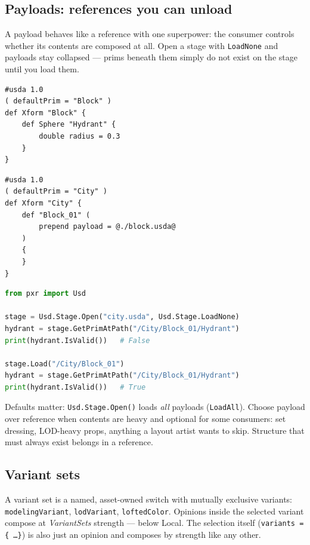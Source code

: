 \subsection{Payloads: references you can unload}\label{sec:c-payloads}
A payload behaves like a reference with one superpower: the
consumer controls whether its contents are composed at all. Open a stage with
\texttt{LoadNone} and payloads stay collapsed --- prims beneath them simply do
not exist on the stage until you load them.

\begin{lstlisting}
#usda 1.0
( defaultPrim = "Block" )
def Xform "Block" {
    def Sphere "Hydrant" {
        double radius = 0.3
    }
}
\end{lstlisting}

\begin{lstlisting}
#usda 1.0
( defaultPrim = "City" )
def Xform "City" {
    def "Block_01" (
        prepend payload = @./block.usda@
    )
    {
    }
}
\end{lstlisting}

\begin{lstlisting}[language=Python]
from pxr import Usd

stage = Usd.Stage.Open("city.usda", Usd.Stage.LoadNone)
hydrant = stage.GetPrimAtPath("/City/Block_01/Hydrant")
print(hydrant.IsValid())   # False

stage.Load("/City/Block_01")
hydrant = stage.GetPrimAtPath("/City/Block_01/Hydrant")
print(hydrant.IsValid())   # True
\end{lstlisting}

\begin{ExamTip}
Defaults matter: \texttt{Usd.Stage.Open()} loads \emph{all} payloads
(\texttt{LoadAll}). Choose payload over reference when contents are heavy and
optional for some consumers: set dressing, LOD-heavy props, anything a layout
artist wants to skip. Structure that must always exist belongs in a reference.
\end{ExamTip}

\subsection{Variant sets}\label{sec:c-variants}
A variant set is a named, asset-owned switch with mutually
exclusive variants: \texttt{modelingVariant}, \texttt{lodVariant},
\texttt{loftedColor}. Opinions inside the selected variant compose at
\emph{VariantSets} strength --- below Local. The selection itself
(\texttt{variants = \{ \ldots \}}) is also just an opinion and composes by
strength like any other.

